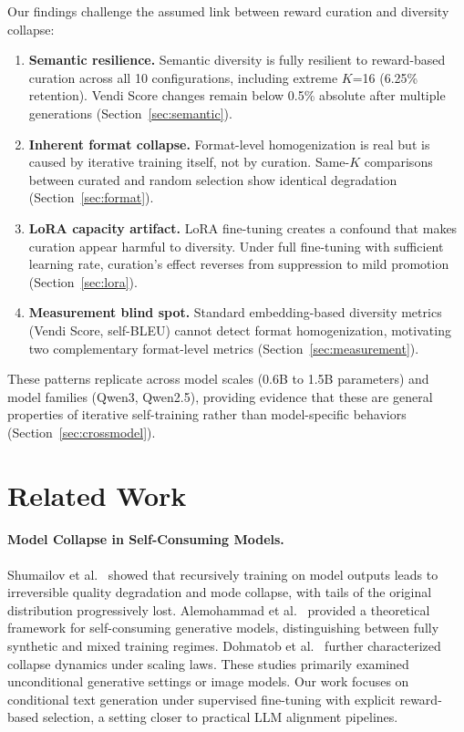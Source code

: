 \documentclass[11pt,a4paper]{article}
\begin{document}
Our findings challenge the assumed link between reward curation and diversity collapse:
\begin{enumerate}[leftmargin=*,itemsep=2pt]
    \item \textbf{Semantic resilience.} Semantic diversity is fully resilient to reward-based curation across all 10 configurations, including extreme $K$=16 (6.25\% retention). Vendi Score changes remain below 0.5\% absolute after multiple generations (Section~\ref{sec:semantic}).
    \item \textbf{Inherent format collapse.} Format-level homogenization is real but is caused by iterative training itself, not by curation. Same-$K$ comparisons between curated and random selection show identical degradation (Section~\ref{sec:format}).
    \item \textbf{LoRA capacity artifact.} LoRA fine-tuning creates a confound that makes curation appear harmful to diversity. Under full fine-tuning with sufficient learning rate, curation's effect reverses from suppression to mild promotion (Section~\ref{sec:lora}).
    \item \textbf{Measurement blind spot.} Standard embedding-based diversity metrics (Vendi Score, self-BLEU) cannot detect format homogenization, motivating two complementary format-level metrics (Section~\ref{sec:measurement}).
\end{enumerate}

These patterns replicate across model scales (0.6B to 1.5B parameters) and model families (Qwen3, Qwen2.5), providing evidence that these are general properties of iterative self-training rather than model-specific behaviors (Section~\ref{sec:crossmodel}).

\section{Related Work}

\paragraph{Model Collapse in Self-Consuming Models.}
Shumailov et al.~\cite{shumailov2024curse} showed that recursively training on model outputs leads to irreversible quality degradation and mode collapse, with tails of the original distribution progressively lost. Alemohammad et al.~\cite{alemohammad2024self} provided a theoretical framework for self-consuming generative models, distinguishing between fully synthetic and mixed training regimes. Dohmatob et al.~\cite{dohmatob2024tale} further characterized collapse dynamics under scaling laws. These studies primarily examined unconditional generative settings or image models. Our work focuses on conditional text generation under supervised fine-tuning with explicit reward-based selection, a setting closer to practical LLM alignment pipelines.
\end{document}
